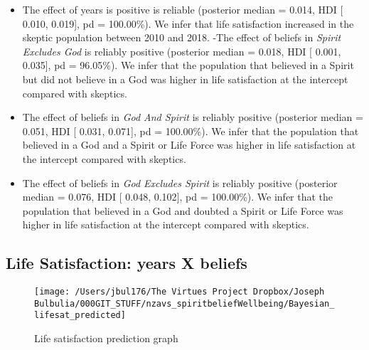 \documentclass[
  english,
  man,floatsintext]{apa6}
\providecommand{\tightlist}{%
  \setlength{\itemsep}{0pt}\setlength{\parskip}{0pt}}
\begin{document}
\begin{itemize}
\tightlist
\item
  The effect of years is positive is reliable (posterior median = 0.014, HDI {[} 0.010, 0.019{]}, pd = 100.00\%). We infer that life satisfaction increased in the skeptic population between 2010 and 2018.
  -The effect of beliefs in \emph{Spirit Excludes God} is reliably positive (posterior median = 0.018, HDI {[} 0.001, 0.035{]}, pd = 96.05\%). We infer that the population that believed in a Spirit but did not believe in a God was higher in life satisfaction at the intercept compared with skeptics.
\item
  The effect of beliefs in \emph{God And Spirit} is reliably positive (posterior median = 0.051, HDI {[} 0.031, 0.071{]}, pd = 100.00\%). We infer that the population that believed in a God and a Spirit or Life Force was higher in life satisfaction at the intercept compared with skeptics.
\item
  The effect of beliefs in \emph{God Excludes Spirit} is reliably positive (posterior median = 0.076, HDI {[} 0.048, 0.102{]}, pd = 100.00\%). We infer that the population that believed in a God and doubted a Spirit or Life Force was higher in life satisfaction at the intercept compared with skeptics.
\end{itemize}

\hypertarget{life-satisfaction-years-x-beliefs}{%
\subsection{Life Satisfaction: years X beliefs}\label{life-satisfaction-years-x-beliefs}}

\begin{figure}
\texttt{[image: /Users/jbul176/The Virtues Project Dropbox/Joseph Bulbulia/000GIT\_STUFF/nzavs\_spiritbeliefWellbeing/Bayesian\_lifesat\_predicted]} \caption{Life satisfaction prediction graph}\label{fig:unnamed-chunk-3}
\end{figure}
\end{document}

